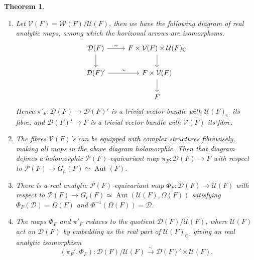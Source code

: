\documentclass[11pt,english]{smfart}
\newtheorem{theorem}{Theorem}
\theoremstyle{definition}
\theoremstyle{remark}
\renewcommand{\C}{\mathbb{C}}
\DeclareMathOperator{\aut}{Aut} %
\newcommand{\isomto}{\stackrel{\sim}{\rightarrow}} %
\begin{document}
\begin{theorem}
    \begin{enumerate}
        \item [(1)] Let $\mathcal{V}(F) = \mathcal{W}(F)/\mathcal{U}(F)$, then we have the following diagram of real analytic maps, among which the horizonal arrows are isomorphsms.
        \[%
        \begin{tikzcd}
        \mathcal{D}(F) \arrow[d] \arrow[r, "\sim"] & F\times \mathcal{V}(F)\times \mathcal{U}(F)_{\C} \arrow[d] \\
        \mathcal{D}(F)' \arrow[r, "\sim"]           & F\times \mathcal{V}(F) \arrow[d]                           \\
                                            & F                                                                    
        \end{tikzcd}\]
        Hence $\pi'_F: \mathcal{D}(F)\to\mathcal{D}(F)'$ is a trivial vector bundle with $\mathcal{U}(F)_\C$ its fibre, and $\mathcal{D}(F)'\to F$ is a trivial vector bundle with $\mathcal{V}(F)$ its fibre.
        \item [(2)] The fibres $\mathcal{V}(F)$'s can be equipped with complex structures fibrewisely, making all maps in the above diagram holomorphic.
        Then that diagram defines a holomorphic $\mathcal{P}(F)$-equivariant map $\pi_F: \mathcal{D}(F)\to F$ with respect to $\mathcal{P}(F)\to G_h(F) \simeq \aut(F)$.
        \item [(3)] There is a real analytic $\mathcal{P}(F)$-equivariant map $\Phi_F:\mathcal{D}(F)\to \mathcal{U}(F)$ with respect to $\mathcal{P}(F)\to G_l(F)\simeq \aut(\mathcal{U}(F), \Omega(F))$ satisfying $\Phi_F(\mathcal{D}) = \Omega(F)$ and $\Phi^{-1}(\Omega(F)) = \mathcal{D}$.
        \item [(4)]
        The maps $\Phi_F$ and $\pi'_F$ reduces to the quotient $\mathcal{D}(F)/\mathcal{U}(F)$, where $\mathcal{U}(F)$ act on $\mathcal{D}(F)$ by embedding as the real part of $\mathcal{U}(F)_\C$, giving an real analytic isomorphism \[(\pi_F', \Phi_F):\mathcal{D}(F)/\mathcal{U}(F)\isomto\mathcal{D}(F)'\times\mathcal{U}(F).\]
    \end{enumerate}
\end{theorem}
\end{document}
